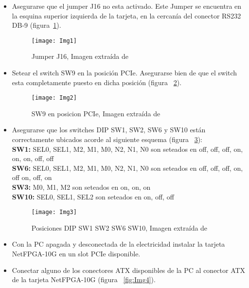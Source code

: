 \begin{itemize}
\item Asegurarse que el jumper J16 no esta activado. Este Jumper se encuentra en la esquina superior izquierda de la tarjeta, en la cercanía del conector RS232 DB-9 (figura~\ref{fig:Img1}).

\begin{figure}[htbp!] 
\centering    
\texttt{[image: Img1]}
\caption[Jumper J16]{Jumper J16, Imagen extra\'ida de \citep{NetFPGA6}}
\label{fig:Img1}
\end{figure}

\item Setear el switch SW9 en la posición PCIe. Asegurarse bien de que el switch esta completamente puesto en dicha posición (figura ~\ref{fig:Img2}).

\begin{figure}[htbp!] 
\centering    
\texttt{[image: Img2]}
\caption[SW9 en posicion PCIe]{SW9 en posicion PCIe, Imagen extra\'ida de \citep{NetFPGA6}}
\label{fig:Img2}
\end{figure}

\item Asegurarse que los switches DIP SW1, SW2, SW6 y SW10 están correctamente ubicados acorde al siguiente esquema (figura ~\ref{fig:Img3}):\\

\textbf{SW1:} SEL0, SEL1, M2, M1, M0, N2, N1, N0 son seteados en off, off, off, on, on, on, off, off\\
\textbf{SW6:} SEL0, SEL1, M2, M1, M0, N2, N1, N0 son seteados en off, off, off, on, off on, off, on\\
\textbf{SW3:} M0, M1, M2 son seteados en on, on, on\\
\textbf{SW10:} SEL0, SEL1, SEL2 son seteados en on, off, off\\

\begin{figure}[htbp!] 
\centering    
\texttt{[image: Img3]}
\caption[Posiciones DIP SW1 SW2 SW6 SW10]{Posiciones DIP SW1 SW2 SW6 SW10, Imagen extra\'ida de \citep{NetFPGA6}}
\label{fig:Img3}
\end{figure}

\item Con la PC apagada y desconectada de la electricidad instalar la tarjeta NetFPGA-10G en un slot PCIe disponible.

\item Conectar alguno de los conectores ATX disponibles de la PC al conector ATX de la tarjeta NetFPGA-10G (figura ~\ref{fig:Img4}).


\end{itemize}
